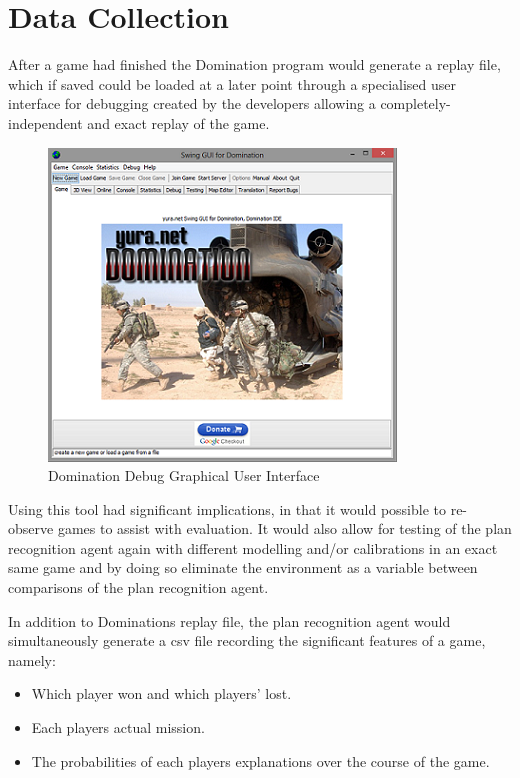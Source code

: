 \documentclass[parskip]{cs4rep}
\begin{document}
\newpage

\section{Data Collection}

After a game had finished the Domination program would generate a replay file, which if saved could be loaded at a later point through a specialised user interface for debugging created by the developers allowing a completely-independent and exact replay of the game.

\begin{figure}[h]
\centerline{
\includegraphics{images/domination-debug-gui.png}
}
\caption{Domination Debug Graphical User Interface}
\label{fig:dom-debug-gui}
\end{figure} 

Using this tool had significant implications, in that it would possible to re-observe games to assist with evaluation. It would also allow for testing of the plan recognition agent again with different modelling and/or calibrations in an exact same game and by doing so eliminate the environment as a variable between comparisons of the plan recognition agent.

In addition to Dominations replay file, the plan recognition agent would simultaneously generate a csv file recording the significant features of a game, namely:

\begin{itemize}
\item
Which player won and which players' lost.
\item
Each players actual mission.
\item
The probabilities of each players explanations over the course of the game.
\end{itemize}
\end{document}
